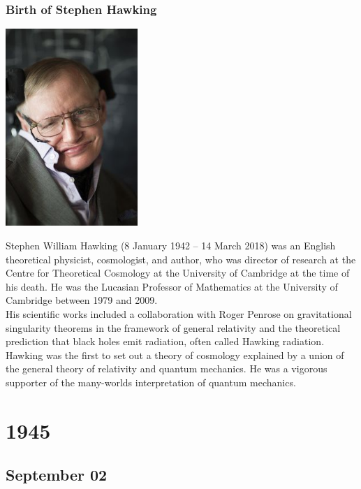 \documentclass[11pt]{report}
\begin{document}
\subsection{Birth of Stephen Hawking}
\vspace{2mm}\begin{center}\includegraphics[width=5cm]{./img/stephenhawking.jpg}\end{center}
Stephen William Hawking (8 January 1942 – 14 March 2018) was an English theoretical physicist, cosmologist, and author, who was director of research at the Centre for Theoretical Cosmology at the University of Cambridge at the time of his death. He was the Lucasian Professor of Mathematics at the University of Cambridge between 1979 and 2009.\\
His scientific works included a collaboration with Roger Penrose on gravitational singularity theorems in the framework of general relativity and the theoretical prediction that black holes emit radiation, often called Hawking radiation. Hawking was the first to set out a theory of cosmology explained by a union of the general theory of relativity and quantum mechanics. He was a vigorous supporter of the many-worlds interpretation of quantum mechanics.

\chapter{1945}
\section{September 02}
\end{document}
